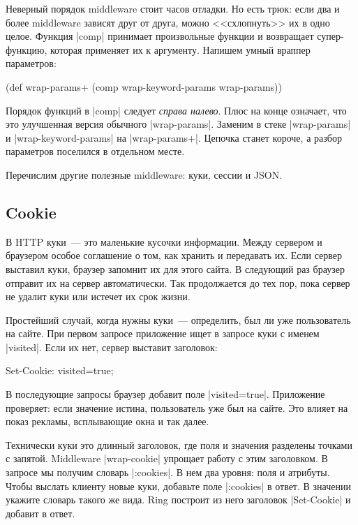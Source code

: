 Неверный порядок middleware стоит часов отладки. Но есть трюк: если два и более
middleware зависят друг от друга, можно <<схлопнуть>> их в одно целое. Функция
\spverb|comp| принимает произвольные функции и возвращает супер-функцию, которая
применяет их к аргументу. Напишем умный враппер параметров:

\begin{english}
  \begin{clojure}
(def wrap-params+ (comp wrap-keyword-params wrap-params))
  \end{clojure}
\end{english}

Порядок функций в \spverb|comp| следует \emph{справа налево}. Плюс на конце
означает, что это улучшенная версия обычного \spverb|wrap-params|. Заменим в
стеке \spverb|wrap-params| и \spverb|wrap-keyword-params| на
\spverb|wrap-params+|. Цепочка станет короче, а разбор параметров поселился в
отдельном месте.

Перечислим другие полезные middleware: куки, сессии и JSON.

\subsection{Cookie}

В HTTP куки~--- это маленькие кусочки информации. Между сервером и браузером
особое соглашение о том, как хранить и передавать их. Если сервер выставил куки,
браузер запомнит их для этого сайта. В следующий раз браузер отправит их на
сервер автоматически. Так продолжается до тех пор, пока сервер не удалит куки
или истечет их срок жизни.

Простейший случай, когда нужны куки~--- определить, был ли уже пользователь на
сайте. При первом запросе приложение ищет в запросе куки с именем
\spverb|visited|. Если их нет, сервер выставит заголовок:

\begin{english}
  \begin{http}
Set-Cookie: visited=true;
  \end{http}
\end{english}

В последующие запросы браузер добавит поле \spverb|visited=true|. Приложение
проверяет: если значение истина, пользователь уже был на сайте.  Это влияет на
показ рекламы, всплывающие окна и так далее.

Технически куки это длинный заголовок, где поля и значения разделены точками с
запятой. Middleware \spverb|wrap-cookie| упрощает работу с этим заголовком. В
запросе мы получим словарь \spverb|:cookies|. В нем два уровня: поля и
атрибуты. Чтобы выслать клиенту новые куки, добавьте поле \spverb|:cookies| в
ответ. В значении укажите словарь такого же вида. Ring построит из него
заголовок \spverb|Set-Cookie| и добавит в ответ.

